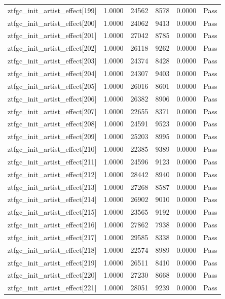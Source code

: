 \begin{table}[htbp]
\begin{tabular}{llrrll}
ztfgc\_init\_artist\_effect[199] & 1.0000 & 24562 & 8578 & 0.0000 & Pass \\
ztfgc\_init\_artist\_effect[200] & 1.0000 & 24062 & 9413 & 0.0000 & Pass \\
ztfgc\_init\_artist\_effect[201] & 1.0000 & 27042 & 8785 & 0.0000 & Pass \\
ztfgc\_init\_artist\_effect[202] & 1.0000 & 26118 & 9262 & 0.0000 & Pass \\
ztfgc\_init\_artist\_effect[203] & 1.0000 & 24374 & 8428 & 0.0000 & Pass \\
ztfgc\_init\_artist\_effect[204] & 1.0000 & 24307 & 9403 & 0.0000 & Pass \\
ztfgc\_init\_artist\_effect[205] & 1.0000 & 26016 & 8601 & 0.0000 & Pass \\
ztfgc\_init\_artist\_effect[206] & 1.0000 & 26382 & 8906 & 0.0000 & Pass \\
ztfgc\_init\_artist\_effect[207] & 1.0000 & 22655 & 8371 & 0.0000 & Pass \\
ztfgc\_init\_artist\_effect[208] & 1.0000 & 24591 & 9523 & 0.0000 & Pass \\
ztfgc\_init\_artist\_effect[209] & 1.0000 & 25203 & 8995 & 0.0000 & Pass \\
ztfgc\_init\_artist\_effect[210] & 1.0000 & 22385 & 9389 & 0.0000 & Pass \\
ztfgc\_init\_artist\_effect[211] & 1.0000 & 24596 & 9123 & 0.0000 & Pass \\
ztfgc\_init\_artist\_effect[212] & 1.0000 & 28442 & 8940 & 0.0000 & Pass \\
ztfgc\_init\_artist\_effect[213] & 1.0000 & 27268 & 8587 & 0.0000 & Pass \\
ztfgc\_init\_artist\_effect[214] & 1.0000 & 26902 & 9010 & 0.0000 & Pass \\
ztfgc\_init\_artist\_effect[215] & 1.0000 & 23565 & 9192 & 0.0000 & Pass \\
ztfgc\_init\_artist\_effect[216] & 1.0000 & 27862 & 7938 & 0.0000 & Pass \\
ztfgc\_init\_artist\_effect[217] & 1.0000 & 29585 & 8338 & 0.0000 & Pass \\
ztfgc\_init\_artist\_effect[218] & 1.0000 & 22574 & 8989 & 0.0000 & Pass \\
ztfgc\_init\_artist\_effect[219] & 1.0000 & 26511 & 8410 & 0.0000 & Pass \\
ztfgc\_init\_artist\_effect[220] & 1.0000 & 27230 & 8668 & 0.0000 & Pass \\
ztfgc\_init\_artist\_effect[221] & 1.0000 & 28051 & 9239 & 0.0000 & Pass \\

\end{tabular}
\end{table}
